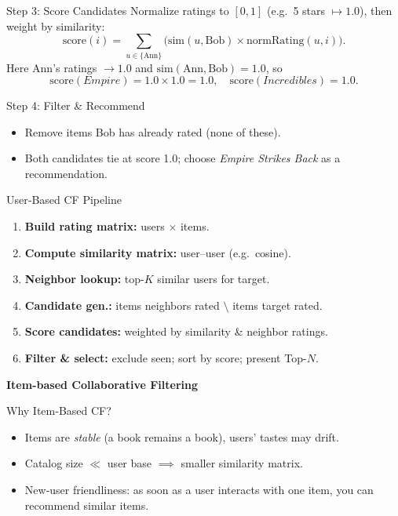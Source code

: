 \documentclass{beamer}
\begin{document}
\begin{frame}{Step 3: Score Candidates}
\normalsize
Normalize ratings to $[0,1]$ (e.g.\ 5 stars $\mapsto1.0$), then weight by similarity:
\[
\text{score}(i)
= \sum_{u\in\{\text{Ann}\}}
  \bigl(\mathrm{sim}(u,\text{Bob})\times\mathrm{normRating}(u,i)\bigr).
\]
Here Ann’s ratings $\to1.0$ and $\mathrm{sim}(\mathrm{Ann},\mathrm{Bob})=1.0$, so
\[
\text{score}(\textit{Empire}) = 1.0\times1.0 = 1.0,\quad
\text{score}(\textit{Incredibles}) = 1.0.
\]
\end{frame}

\begin{frame}{Step 4: Filter \& Recommend}
\begin{itemize}
  \item Remove items Bob has already rated (none of these).
  \item Both candidates tie at score 1.0; choose \textit{Empire Strikes Back} as a recommendation.
\end{itemize}
\end{frame}

\begin{frame}{User‐Based CF Pipeline}
\begin{enumerate}
  \item \textbf{Build rating matrix:} users $\times$ items.
  \item \textbf{Compute similarity matrix:} user–user (e.g.\ cosine).
  \item \textbf{Neighbor lookup:} top-$K$ similar users for target.
  \item \textbf{Candidate gen.:} items neighbors rated \(\setminus\) items target rated.
  \item \textbf{Score candidates:} weighted by similarity \& neighbor ratings.
  \item \textbf{Filter \& select:} exclude seen; sort by score; present Top-$N$.
\end{enumerate}
\end{frame}

\begin{frame}[plain]
    \begin{center}
        {\LARGE \textbf{Item-based Collaborative Filtering}}
    \end{center}
\end{frame}

\begin{frame}{Why Item‐Based CF?}
\begin{itemize}
  \item Items are \emph{stable} (a book remains a book), users' tastes may drift.
  \item Catalog size \(\ll\) user base \(\implies\) smaller similarity matrix.
  \item New‐user friendliness: as soon as a user interacts with one item, you can recommend similar items.
\end{itemize}
\end{frame}
\end{document}

